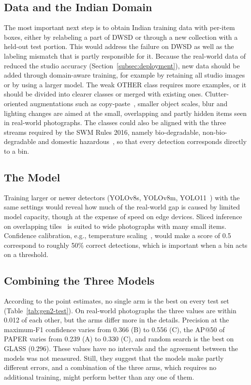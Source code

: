 \subsection{Data and the Indian Domain}
\label{subsec:fw-data}

The most important next step is to obtain Indian training data with per-item boxes, either by relabeling a part of DWSD or through a new collection with a held-out test portion. This would address the failure on DWSD as well as the labeling mismatch that is partly responsible for it. Because the real-world data of \gentwo reduced the studio accuracy (Section~\ref{subsec:deployment}), new data should be added through domain-aware training, for example by retaining all studio images or by using a larger model. The weak OTHER class requires more examples, or it should be divided into clearer classes or merged with existing ones. Clutter-oriented augmentations such as copy-paste~\cite{ghiasi2021simple}, smaller object scales, blur and lighting changes are aimed at the small, overlapping and partly hidden items seen in real-world photographs. The classes could also be aligned with the three streams required by the SWM Rules 2016, namely bio-degradable, non-bio-degradable and domestic hazardous~\cite{moefcc2016solid}, so that every detection corresponds directly to a bin.

\subsection{The Model}
\label{subsec:fw-model}

Training larger or newer detectors (YOLOv8s, YOLOv8m, YOLO11~\cite{jocher2024yolo11}) with the same settings would reveal how much of the real-world gap is caused by limited model capacity, though at the expense of speed on edge devices. Sliced inference on overlapping tiles~\cite{akyon2022slicing} is suited to wide photographs with many small items. Confidence calibration, e.g., temperature scaling~\cite{guo2017calibration}, would make a score of 0.5 correspond to roughly 50\% correct detections, which is important when a bin acts on a threshold.

\subsection{Combining the Three Models}
\label{subsec:fw-ensemble}

According to the point estimates, no single arm is the best on every \gentwo test set (Table~\ref{tab:gen2-test}). On real-world photographs the three \mapfifty values are within 0.012 of each other, but the arms differ more in the details. Precision at the maximum-F1 confidence varies from 0.366 (B) to 0.556 (C), the AP@50 of PAPER varies from 0.239 (A) to 0.330 (C), and random search is the best on GLASS (0.296). These values have no intervals and the agreement between the models was not measured. Still, they suggest that the models make partly different errors, and a combination of the three arms, which requires no additional training, might perform better than any one of them.

